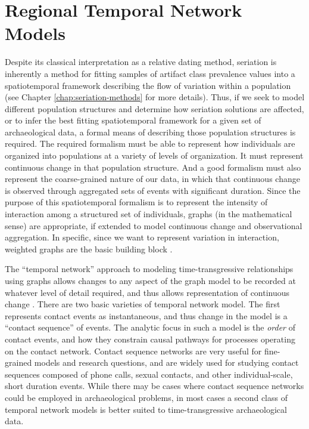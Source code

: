 \section{Regional Temporal Network Models}

Despite its classical interpretation as a relative dating method, seriation is inherently a method for fitting samples of artifact class prevalence values into a spatiotemporal framework describing the flow of variation within a population (see Chapter \ref{chap:seriation-methods} for more details).  Thus, if we seek to model different population structures and determine how seriation solutions are affected, or to infer the best fitting spatiotemporal framework for a given set of archaeological data, a formal means of describing those population structures is required.  The required formalism must be able to represent how individuals are organized into populations at a variety of levels of organization.  It must represent continuous change in that population structure.  And a good formalism must also represent the coarse-grained nature of our data, in which that continuous change is observed through aggregated sets of events with significant duration.   Since the purpose of this spatiotemporal formalism is to represent the intensity of interaction among a structured set of individuals, graphs (in the mathematical sense) are appropriate, if extended to model continuous change and observational aggregation.  In specific, since we want to represent variation in interaction, weighted graphs are the basic building block \citep{Diestel2010a,Harary1969}.  

The ``temporal network'' approach to modeling time-transgressive relationships using graphs allows changes to any aspect of the graph model to be recorded at whatever level of detail required, and thus allows representation of continuous change \citep{Holme2012}.  There are two basic varieties of temporal network model.  The first represents contact events as instantaneous, and thus change in the model is a ``contact sequence'' of events.  The analytic focus in such a model is the \emph{order} of contact events, and how they constrain causal pathways for processes operating on the contact network.  Contact sequence networks are very useful for fine-grained models and research questions, and are widely used for studying contact sequences composed of phone calls, sexual contacts, and other individual-scale, short duration events.  While there may be cases where contact sequence networks could be employed in archaeological problems, in most cases a second class of temporal network models is better suited to time-transgressive archaeological data.  

